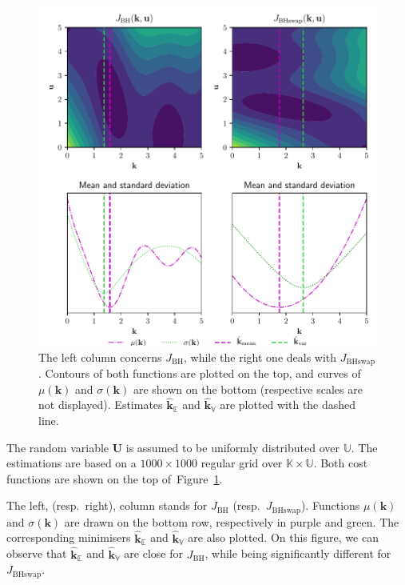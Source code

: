 \documentclass[preprint, 1p]{elsarticle}
\newcommand{\Ex}{\mathbb{E}}
\newcommand{\kmean}{{\mathbf{k}}_{\Ex}}
\newcommand{\hatkmean}{\hat{\mathbf{k}}_{\Ex}}
\newcommand{\kvar}{{\mathbf{k}}_{\mathbb{V}}}
\newcommand{\hatkvar}{\hat{\mathbf{k}}_{\mathbb{V}}}
\newcommand{\Kspace}{\mathbb{K}}
\newcommand{\Uspace}{\mathbb{U}}
\newcommand{\JBH}{J_{\mathrm{BH}}}
\newcommand{\JBHS}{J_{\mathrm{BHswap}}}
\newlength{\singlecolumnsize}
\begin{document}
\begin{figure}[!ht]
  \centering
  \includegraphics[width=\singlecolumnsize]{Figures/FIG01.pdf}
  \caption{The left column concerns $\JBH$, while the right one deals with $\JBHS$. Contours of both functions are plotted on the top, and curves of  $\mu(\mathbf{k})$ and $\sigma(\mathbf{k})$ are shown on the bottom (respective scales are not displayed). Estimates $\hatkmean$ and $\hatkvar$ are plotted with the dashed line.}
\label{fig:branin_moments}
\end{figure}


The random variable $\mathbf{U}$ is assumed to be uniformly distributed over $\Uspace$.
The estimations are %
based on a $1000 \times 1000$ regular grid over $\Kspace\times\Uspace$. Both cost functions are shown on the top of~Figure~\ref{fig:branin_moments}.


The left, (resp.\ right), column stands for $\JBH$ (resp.\ $\JBHS$).
Functions $\mu(\mathbf{k})$ and $\sigma(\mathbf{k})$ are drawn on the bottom row, respectively in purple and green. The corresponding minimisers $\hatkmean$ and $\hatkvar$ are also plotted.
On this figure, we can observe that $\hatkmean$ and $\hatkvar$ are close for $\JBH$, while being significantly different for $\JBHS$.
\end{document}
